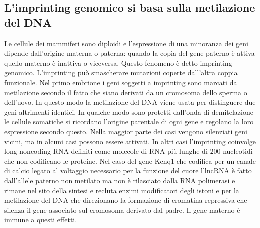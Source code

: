\subsection{L'imprinting genomico si basa sulla metilazione del DNA}
Le cellule dei mammiferi sono diploidi e l'espressione di una minoranza dei geni dipende dall'origine materna o paterna: quando la copia del gene paterno \`e
attiva quello materno \`e inattiva o viceversa. Questo fenomeno \`e detto imprinting genomico. L'imprinting pu\`o smascherare mutazioni coperte dall'altra coppia funzionale. Nel primo 
embrione i geni soggetti a imprinting sono marcati da metilazione secondo il fatto che siano derivati da un cromosoma dello sperma o dell'uovo. In questo modo la metilazione del DNA 
viene usata per distinguere due geni altrimenti identici. In qualche modo sono protetti dall'onda di demitelazione le cellule somatiche si ricordano l'origine parentale di ogni gene e 
regolano la loro espressione secondo questo. Nella maggior parte dei casi vengono silenziati geni vicini, ma in alcuni casi possono essere attivati. In altri casi l'imprinting coinvolge
long noncoding RNA definiti come molecole di RNA pi\`u lunghe di $200$ nucleotidi che non codificano le proteine. Nel caso del gene Kcnq1 che codifica per un canale di calcio legato
al voltaggio necessario per la funzione del cuore l'lncRNA \`e fatto dall'allele paterno non metilato ma non \`e rilasciato dalla RNA polimerasi e rimane nel sito della sintesi e recluta
enzimi modificatori degli istoni e per la metilazione del DNA che direzionano la formazione di cromatina repressiva che silenza il gene associato sul cromosoma derivato dal padre. Il 
gene materno \`e immune a questi effetti. 
